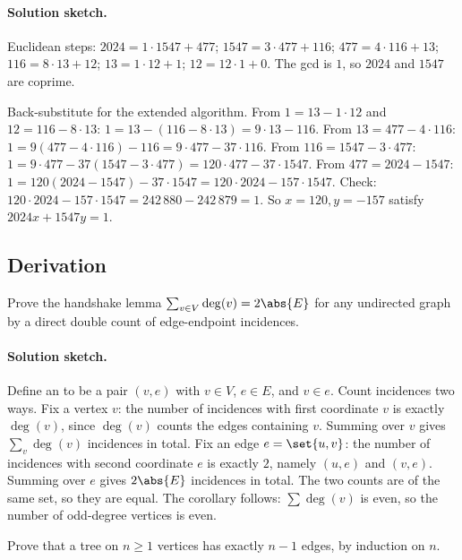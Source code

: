\paragraph{Solution sketch.}
Euclidean steps:
$2024 = 1 \cdot 1547 + 477$;
$1547 = 3 \cdot 477 + 116$;
$477 = 4 \cdot 116 + 13$;
$116 = 8 \cdot 13 + 12$;
$13 = 1 \cdot 12 + 1$;
$12 = 12 \cdot 1 + 0$. The gcd is $1$, so $2024$ and $1547$ are
coprime.

Back-substitute for the extended algorithm. From $1 = 13 - 1 \cdot
12$ and $12 = 116 - 8 \cdot 13$: $1 = 13 - (116 - 8 \cdot 13) = 9
\cdot 13 - 116$. From $13 = 477 - 4 \cdot 116$: $1 = 9(477 - 4
\cdot 116) - 116 = 9 \cdot 477 - 37 \cdot 116$. From $116 = 1547 -
3 \cdot 477$: $1 = 9 \cdot 477 - 37(1547 - 3 \cdot 477) = 120
\cdot 477 - 37 \cdot 1547$. From $477 = 2024 - 1547$: $1 = 120
(2024 - 1547) - 37 \cdot 1547 = 120 \cdot 2024 - 157 \cdot 1547$.
Check: $120 \cdot 2024 - 157 \cdot 1547 = 242\,880 - 242\,879 = 1$.
So $x = 120, y = -157$ satisfy $2024 x + 1547 y = 1$.

\subsection*{Derivation}

\begin{exercise}
Prove the handshake lemma $\sum_{v \in V} \deg(v) = 2 \abs{E}$ for
any undirected graph by a direct double count of edge-endpoint
incidences.
\end{exercise}

\paragraph{Solution sketch.}
Define an  to be a pair $(v, e)$ with $v \in V$,
$e \in E$, and $v \in e$. Count incidences two ways. Fix a vertex
$v$: the number of incidences with first coordinate $v$ is exactly
$\deg(v)$, since $\deg(v)$ counts the edges containing $v$. Summing
over $v$ gives $\sum_{v} \deg(v)$ incidences in total. Fix an edge
$e = \set{u, v}$: the number of incidences with second coordinate
$e$ is exactly $2$, namely $(u, e)$ and $(v, e)$. Summing over $e$
gives $2 \abs{E}$ incidences in total. The two counts are of the
same set, so they are equal. The corollary follows: $\sum
\deg(v)$ is even, so the number of odd-degree vertices is even.

\begin{exercise}
Prove that a tree on $n \geq 1$ vertices has exactly $n - 1$
edges, by induction on $n$.
\end{exercise}

